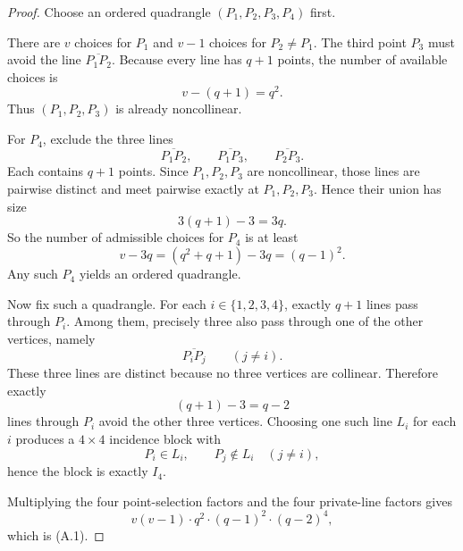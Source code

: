 \documentclass[10pt,a4paper]{amsart}
\begin{document}
\begin{proof}
Choose an ordered quadrangle $(P_1,P_2,P_3,P_4)$ first.

There are $v$ choices for $P_1$ and $v-1$ choices for $P_2\neq P_1$.
The third point $P_3$ must avoid the line $\overline{P_1P_2}$.
Because every line has $q+1$ points, the number of available choices is
\[
v-(q+1)=q^2.
\]
Thus $(P_1,P_2,P_3)$ is already noncollinear.

For $P_4$, exclude the three lines
\[
\overline{P_1P_2},\qquad \overline{P_1P_3},\qquad \overline{P_2P_3}.
\]
Each contains $q+1$ points.
Since $P_1,P_2,P_3$ are noncollinear, those lines are pairwise distinct and meet pairwise exactly at $P_1,P_2,P_3$.
Hence their union has size
\[
3(q+1)-3=3q.
\]
So the number of admissible choices for $P_4$ is at least
\[
v-3q=(q^2+q+1)-3q=(q-1)^2.
\]
Any such $P_4$ yields an ordered quadrangle.

Now fix such a quadrangle.
For each $i\in\{1,2,3,4\}$, exactly $q+1$ lines pass through $P_i$.
Among them, precisely three also pass through one of the other vertices, namely
\[
\overline{P_iP_j}\qquad (j\neq i).
\]
These three lines are distinct because no three vertices are collinear.
Therefore exactly
\[
(q+1)-3=q-2
\]
lines through $P_i$ avoid the other three vertices.
Choosing one such line $L_i$ for each $i$ produces a $4\times4$ incidence block with
\[
P_i\in L_i,\qquad P_j\notin L_i\quad (j\neq i),
\]
hence the block is exactly $I_4$.

Multiplying the four point-selection factors and the four private-line factors gives
\[
v(v-1)\cdot q^2\cdot (q-1)^2\cdot (q-2)^4,
\]
which is \textup{(A.1)}.
\end{proof}
\end{document}
